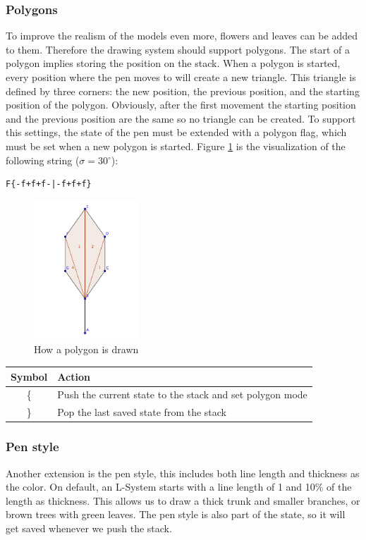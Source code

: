 \documentclass[11pt,a4paper]{article}
\newcommand{\degree}{\ensuremath{^\circ}}
\begin{document}
\subsubsection{Polygons}
To improve the realism of the models even more, flowers and leaves can be added to them. Therefore the drawing system should support polygons. The start of a polygon implies storing the position on the stack. When a polygon is started, every position where the pen moves to will create a new triangle. This triangle is defined by three corners: the new position, the previous position, and the starting position of the polygon. Obviously, after the first movement the starting position and the previous position are the same so no triangle can be created. To support this settings, the state of the pen must be extended with a polygon flag, which must be set when a new polygon is started.
Figure \ref{fig:polygon} is the visualization of the following string ($\sigma = 30\degree$):
\begin{verbatim}
F{-f+f+f-|-f+f+f}
\end{verbatim}

\begin{figure}[h!]
  \centering
  \includegraphics[width=0.35\textwidth]{polygons.pdf}
  \caption{How a polygon is drawn}
  \label{fig:polygon}
\end{figure}

\begin{center}
\begin{tabular}{c | l}
Symbol & Action \\ \hline
\{ & Push the current state to the stack and set polygon mode \\
\} & Pop the last saved state from the stack \\
\end{tabular}
\end{center}

\subsubsection{Pen style}
Another extension is the pen style, this includes both line length and thickness as the color. On default, an L-System starts with a line length of 1 and 10\% of the length as thickness. This allows us to draw a thick trunk and smaller branches, or brown trees with green leaves. The pen style is also part of the state, so it will get saved whenever we push the stack.
\end{document}
